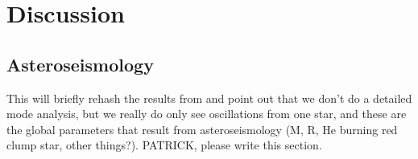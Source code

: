 \section{Discussion}\label{discuss}

\subsection{Asteroseismology}\label{seismo}
This will briefly rehash the results from \citet{gau14} and point out that we don't do a detailed mode analysis, but we really do only see oscillations from one star, and these are the global parameters that result from asteroseismology (M, R, He burning red clump star, other things?). PATRICK, please write this section.

%
